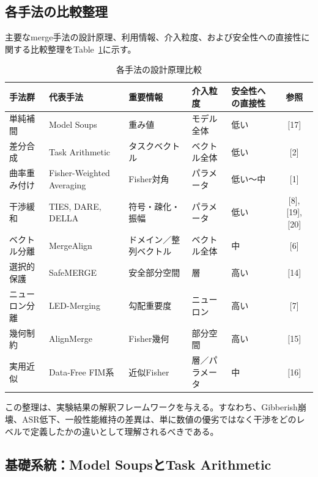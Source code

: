 \documentclass{article}
\begin{document}
\subsection{各手法の比較整理}
主要なmerge手法の設計原理、利用情報、介入粒度、および安全性への直接性に関する比較整理をTable~\ref{tab:method_comparison}に示す。
\begin{table}[t]
\centering
\caption{各手法の設計原理比較}
\label{tab:method_comparison}
\small
\begin{tabular}{p{2.0cm}p{2.4cm}p{2.5cm}p{2.0cm}p{2.2cm}c}
\toprule
手法群 & 代表手法 & 重要情報 & 介入粒度 & 安全性への直接性 & 参照 \\
\midrule
単純補間 & Model Soups & 重み値 & モデル全体 & 低い & [17] \\

差分合成 & Task Arithmetic & タスクベクトル & ベクトル全体 & 低い & [2] \\

曲率重み付け & Fisher-Weighted Averaging & Fisher対角 & パラメータ & 低い〜中 & [1] \\

干渉緩和 & TIES, DARE, DELLA & 符号・疎化・振幅 & パラメータ & 低い & [8], [19], [20] \\

ベクトル分離 & MergeAlign & ドメイン／整列ベクトル & ベクトル全体 & 中 & [6] \\

選択的保護 & SafeMERGE & 安全部分空間 & 層 & 高い & [14] \\

ニューロン分離 & LED-Merging & 勾配重要度 & ニューロン & 高い & [7] \\

幾何制約 & AlignMerge & Fisher幾何 & 部分空間 & 高い & [15] \\

実用近似 & Data-Free FIM系 & 近似Fisher & 層／パラメータ & 中 & [16] \\
\bottomrule
\end{tabular}
\end{table}

この整理は、実験結果の解釈フレームワークを与える。すなわち、Gibberish崩壊、ASR低下、一般性能維持の差異は、単に数値の優劣ではなく干渉をどのレベルで定義したかの違いとして理解されるべきである。


\subsection{基礎系統：Model SoupsとTask Arithmetic}
\end{document}
